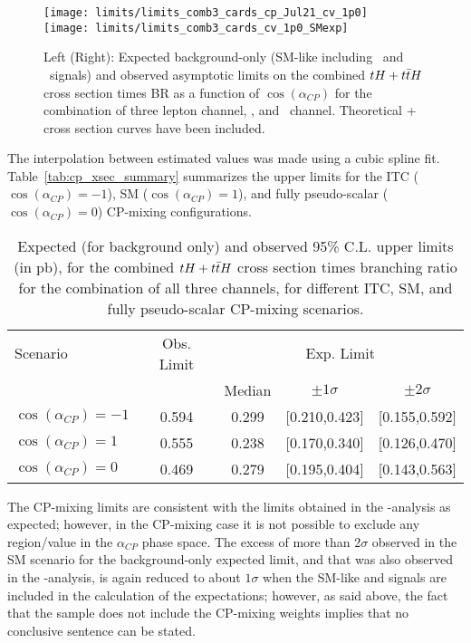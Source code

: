 \begin{figure} [!h]
      \centering
      \texttt{[image: limits/limits\_comb3\_cards\_cp\_Jul21\_cv\_1p0]}\\
      \texttt{[image: limits/limits\_comb3\_cards\_cv\_1p0\_SMexp]}
      \caption[Asymptotic limits on the combined $\tH+\ttH$ $\sigma\times$BR for CP mixing angle.]{Left (Right): Expected background-only (SM-like including  \ttH\ and \tH\ signals) and observed asymptotic limits on the combined $\tH+\ttH$ cross section times BR as a function of $\cos (\alpha_{CP})$ for the combination of three lepton channel, \mumu, and \emu\ channel. Theoretical \tH + \ttH cross section curves have been included.}
\label{fig:cp_limits}
\end{figure}

The interpolation between estimated values was made using a cubic spline fit. Table~\ref{tab:cp_xsec_summary} summarizes the upper limits for the ITC ($\cos (\alpha_{CP})=-1$), SM ($\cos (\alpha_{CP})=1$), and fully pseudo-scalar ($\cos (\alpha_{CP})=0$) CP-mixing configurations.

\begin{table}[h!]
\centering
\small
\begin{tabular}{lcccc}\hline
Scenario               &  Obs. Limit & \multicolumn{3}{c}{Exp. Limit}           \\
                       &             & Median  & $\pm 1\sigma$ & $\pm 2\sigma$  \\ \hline
$\cos (\alpha_{CP})=-1$& 0.594       & 0.299   & [0.210,0.423] & [0.155,0.592]  \\
$\cos (\alpha_{CP})=1$ & 0.555       & 0.238   & [0.170,0.340] & [0.126,0.470]  \\  
$\cos (\alpha_{CP})=0$ & 0.469       & 0.279   & [0.195,0.404] & [0.143,0.563]  \\\hline   
\end{tabular}
 \caption[Summary of expected and observed upper limits for CP-mixing angles.]{Expected (for background only) and observed 95\% C.L. upper limits (in pb), for the combined $\tH+\ttH$ cross section times branching ratio for the combination of all three channels, for different ITC, SM, and fully pseudo-scalar CP-mixing scenarios.}\label{tab:cp_xsec_summary}
\label{tab:limits}
\end{table}

The CP-mixing limits are consistent with the limits obtained in the \Ct-\CV analysis as expected; however, in the CP-mixing case it is not possible to exclude any region/value in the $\alpha_{CP}$ phase space. The excess of more than 2$\sigma$ observed in the SM scenario for the background-only expected limit, and that was also observed in the \Ct-\CV analysis, is again reduced to about $1\sigma$ when the SM-like \tH and \ttH signals are included in the calculation of the expectations; however, as said above, the fact that the \ttH sample does not include the CP-mixing weights implies that no conclusive sentence can be stated.

